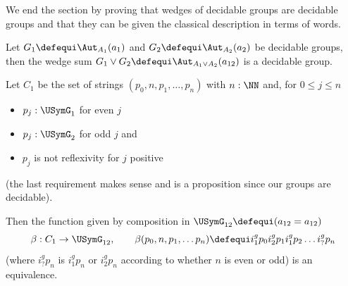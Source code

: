 We end the section by proving that wedges of decidable groups are decidable groups and that they can be given the classical description in terms of words.


\begin{lemma}
  \label{lem:wedgeofgpoidisgpoid}
  Let $G_1\defequi\Aut_{A_1}(a_1)$ and $G_2\defequi\Aut_{A_2}(a_2)$ be decidable groups, then the wedge sum $G_1\vee G_2\defequi\Aut_{A_1\vee A_2}(a_{12})$ is a decidable group.

Let $C_1$ be the set of strings $(p_0,n,p_1,\dots,p_n)$ with $n:\NN$ and, for $0\leq j\leq n$
\begin{itemize}
\item $p_{j}:\USymG_1%
  $  for even $j$
\item $p_{j}:\USymG_2%
  $ for odd $j$ and
\item $p_j$ is not reflexivity for $j$ positive
\end{itemize}
(the last requirement makes sense and is a proposition since our groups are decidable).

  Then the function given by composition in $\USymG_{12}\defequi(a_{12}=a_{12})$
  $$\beta:C_1\to\USymG_{12}%
  ,\qquad\beta(p_0,n,p_1,\dots p_n)\defequi i_1^gp_0i_2^gp_1i_1^gp_2\dots i_?^gp_n$$
(where $i_?^gp_n$  is $i_1^gp_n$ or $i_2^gp_n$ according to whether $n$ is even or odd) is an equivalence.
\end{lemma}
